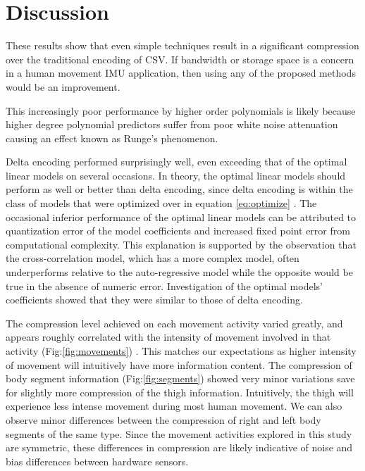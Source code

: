\documentclass[journal]{IEEEtran}
\begin{document}
\begin{table}[htbp]
{\begin{tabular}{|l|r|r|r|r|r|r|r|r|r|r|r|r|}
\end{tabular}%
}%

\end{table}



\section{Discussion}

These results show that even simple techniques result in a significant compression over the traditional encoding of CSV. If bandwidth or storage space is a concern in a human movement IMU application, then using any of the proposed methods would be an improvement.

This increasingly poor performance by higher order polynomials is likely because higher degree polynomial predictors suffer from poor white noise attenuation \cite{Tanskanen2000} causing an effect known as Runge's phenomenon.

Delta encoding performed surprisingly well, even exceeding that of the optimal linear models on several occasions. In theory, the optimal linear models should perform as well or better than delta encoding, since delta encoding is within the class of models that were optimized over in equation \eqref{eq:optimize} . The occasional inferior performance of the optimal linear models can be attributed to quantization error of the model coefficients and increased fixed point error from computational complexity. This explanation is supported by the observation that the cross-correlation model, which has a more complex model, often underperforms relative to the auto-regressive model while the opposite would be true in the absence of numeric error. Investigation of the optimal models' coefficients showed that they were similar to those of delta encoding.

The compression level achieved on each movement activity varied greatly, and appears roughly correlated with the intensity of movement involved in that activity (Fig:\ref{fig:movements}) . This matches our expectations as higher intensity of movement will intuitively have more information content. The compression of body segment information (Fig:\ref{fig:segments}) showed very minor variations save for slightly more compression of the thigh information. Intuitively, the thigh will experience less intense movement during most human movement. We can also observe minor differences between the compression of right and left body segments of the same type. Since the movement activities explored in this study are symmetric, these differences in compression are likely indicative of noise and bias differences between hardware sensors.
\end{document}
